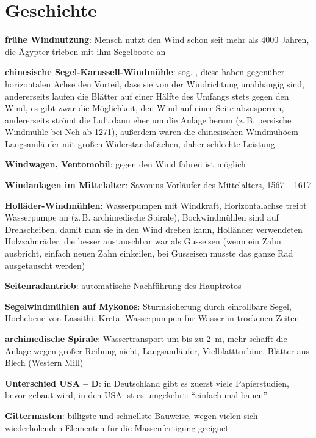 \section{%
    Geschichte%
}

\textbf{frühe Windnutzung}:
Mensch nutzt den Wind schon seit mehr als 4000 Jahren,
die Ägypter trieben mit ihm Segelboote an

\textbf{chinesische Segel-Karussell-Windmühle}:
sog. ,
diese haben gegenüber horizontalen Achse den Vorteil, dass sie von der Windrichtung unabhängig
sind,
andererseits laufen die Blätter auf einer Hälfte des Umfangs stets gegen den Wind,
es gibt zwar die Möglichkeit, den Wind auf einer Seite abzusperren,
andererseits strömt die Luft dann eher um die Anlage herum
(z.\,B. persische Windmühle bei Neh ab 1271),
außerdem waren die chinesischen Windmühöem Langsamläufer mit großen Widerstandsflächen,
daher schlechte Leistung

\textbf{Windwagen, Ventomobil}:
gegen den Wind fahren ist möglich

\textbf{Windanlagen im Mittelalter}:
Savonius-Vorläufer des Mittelalters, 1567 -- 1617

\textbf{Holläder-Windmühlen}:
Wasserpumpen mit Windkraft,
Horizontalachse treibt Wasserpumpe an (z.\,B. archimedische Spirale),
Bockwindmühlen sind auf Drehscheiben, damit man sie in den Wind drehen kann,
Holländer verwendeten Holzzahnräder, die besser austauschbar war als Gusseisen
(wenn ein Zahn ausbricht, einfach neuen Zahn einkeilen, bei Gusseisen musste das ganze
Rad ausgetauscht werden)

\textbf{Seitenradantrieb}:
automatische Nachführung des Hauptrotos

\textbf{Segelwindmühlen auf Mykonos}:
Sturmsicherung durch einrollbare Segel,
Hochebene von Lassithi, Kreta:
Wasserpumpen für Wasser in trockenen Zeiten

\linie

\textbf{archimedische Spirale}:
Wassertransport um bis zu \SI{2}{\meter},
mehr schafft die Anlage wegen großer Reibung nicht,
Langsamläufer,
Vielblattturbine,
Blätter aus Blech
(Western Mill)

\textbf{Unterschied USA -- D}:
in Deutschland gibt es zuerst viele Papierstudien, bevor gebaut wird,
in den USA ist es umgekehrt: "`einfach mal bauen"'

\textbf{Gittermasten}:
billigste und schnellste Bauweise,
wegen vielen sich wiederholenden Elementen für die Massenfertigung geeignet

